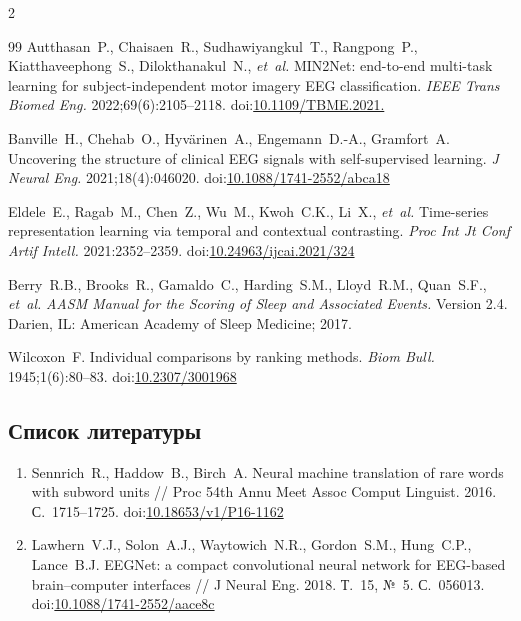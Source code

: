 \documentclass[14pt,a4paper]{extarticle}
\begin{document}
\begin{multicols}{2}
\begin{thebibliography}{99}
Autthasan~P., Chaisaen~R., Sudhawiyangkul~T., Rangpong~P., Kiatthaveephong~S.,
Dilokthanakul~N., \textit{et~al.}
MIN2Net: end-to-end multi-task learning for subject-independent motor imagery EEG classification.
\textit{IEEE Trans Biomed Eng.} 2022;69(6):2105--2118.
doi:\href{https://doi.org/10.1109/TBME.2021.3137184}{10.1109/\allowbreak TBME.2021.}

Banville~H., Chehab~O., Hyvärinen~A., Engemann~D.-A., Gramfort~A.
Uncovering the structure of clinical EEG signals with self-supervised learning.
\textit{J Neural Eng.} 2021;18(4):046020.
doi:\href{https://doi.org/10.1088/1741-2552/abca18}{10.1088/1741-2552/abca18}

Eldele~E., Ragab~M., Chen~Z., Wu~M., Kwoh~C.K., Li~X., \textit{et~al.}
Time-series representation learning via temporal and contextual contrasting.
\textit{Proc Int Jt Conf Artif Intell.} 2021:2352--2359.
doi:\href{https://doi.org/10.24963/ijcai.2021/324}{10.24963/ijcai.2021/324}

Berry~R.B., Brooks~R., Gamaldo~C., Harding~S.M., Lloyd~R.M., Quan~S.F., \textit{et~al.}
\textit{AASM Manual for the Scoring of Sleep and Associated Events.} Version 2.4.
Darien, IL: American Academy of Sleep Medicine; 2017.

Wilcoxon~F.
Individual comparisons by ranking methods.
\textit{Biom Bull.} 1945;1(6):80--83.
doi:\href{https://doi.org/10.2307/3001968}{10.2307/3001968}

\end{thebibliography}

\begin{otherlanguage}{russian}
\section*{Список литературы}
\begin{enumerate}[leftmargin=*,label={\arabic*.},itemsep=3pt,topsep=4pt]
\sloppy\raggedright

\item Sennrich~R., Haddow~B., Birch~A.
Neural machine translation of rare words with subword units
// Proc 54th Annu Meet Assoc Comput Linguist. 2016. С.~1715--1725.
doi:\href{https://doi.org/10.18653/v1/P16-1162}{10.18653/v1/P16-1162}

\item Lawhern~V.J., Solon~A.J., Waytowich~N.R., Gordon~S.M., Hung~C.P., Lance~B.J.
EEGNet: a compact convolutional neural network for EEG-based brain--computer interfaces
// J Neural Eng. 2018. Т.~15, №~5. С.~056013.
doi:\href{https://doi.org/10.1088/1741-2552/aace8c}{10.1088/1741-2552/aace8c}


\end{enumerate}
\end{otherlanguage}
\end{multicols}
\end{document}

